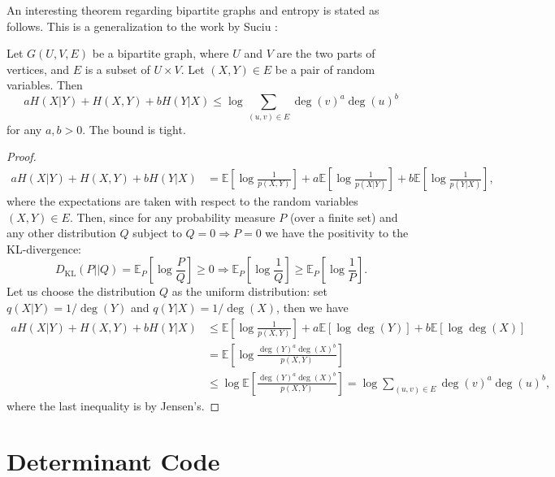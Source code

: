 
An interesting theorem regarding bipartite graphs and entropy is stated as follows. This is a generalization to the work by Suciu \cite{Suciu}:
\begin{theorem}
    Let $G(U,V,E)$ be a bipartite graph, where $U$ and $V$ are the two parts of vertices, and $E$ is a subset of $U\times V$. Let $(X,Y)\in E$ be a pair of random variables. Then
    \begin{equation}
        a H(X\vert Y) + H(X,Y) + bH(Y\vert X) \le \log\sum_{(u,v)\in E} \deg(v)^a\deg(u)^b
    \end{equation}
    for any $a,b>0$. The bound is tight.
\end{theorem}
\begin{proof}
    \begin{align*}
        aH(X\vert Y) + H(X,Y) + bH(Y\vert X) &= \mathbb{E}\left[\log\frac{1}{p(X,Y)}\right] + a \mathbb{E}\left[\log\frac{1}{p(X\vert Y)}\right] + b \mathbb{E}\left[\log\frac{1}{p(Y\vert X)}\right],
    \end{align*}
    where the expectations are taken with respect to the random variables $(X,Y)\in E$. Then, since for any probability measure $P$ (over a finite set) and any other distribution $Q$ subject to $Q=0\Rightarrow P=0$ we have the positivity to the KL-divergence:
    \begin{equation*}
        D_{\mathrm{KL}}(P\vert\vert Q) = \mathbb{E}_P\left[\log\frac{P}{Q}\right] \ge 0 \Rightarrow \mathbb{E}_P\left[\log \frac{1}{Q}\right] \ge \mathbb{E}_P\left[\log \frac{1}{P}\right].
    \end{equation*}
    Let us choose the distribution $Q$ as the uniform distribution: set $q(X\vert Y) = 1/\deg(Y)$ and $q(Y\vert X) = 1/\deg(X)$, then we have
    \begin{align*}
        aH(X\vert Y) + H(X,Y) + bH(Y\vert X) &\le \mathbb{E}\left[\log\frac{1}{p(X,Y)}\right] + a\mathbb{E}\left[\log\deg(Y)\right] + b\mathbb{E}\left[\log\deg(X)\right] \\
        &= \mathbb{E}\left[\log\frac{\deg(Y)^a\deg(X)^b}{p(X,Y)}\right] \\
        &\le \log\mathbb{E}\left[\frac{\deg(Y)^a\deg(X)^b}{p(X,Y)}\right] = \log \sum_{(u,v)\in E} \deg(v)^a\deg(u)^b,
    \end{align*}
    where the last inequality is by Jensen's.
\end{proof}

\section{Determinant Code}
\cite{Determinant_Code}
